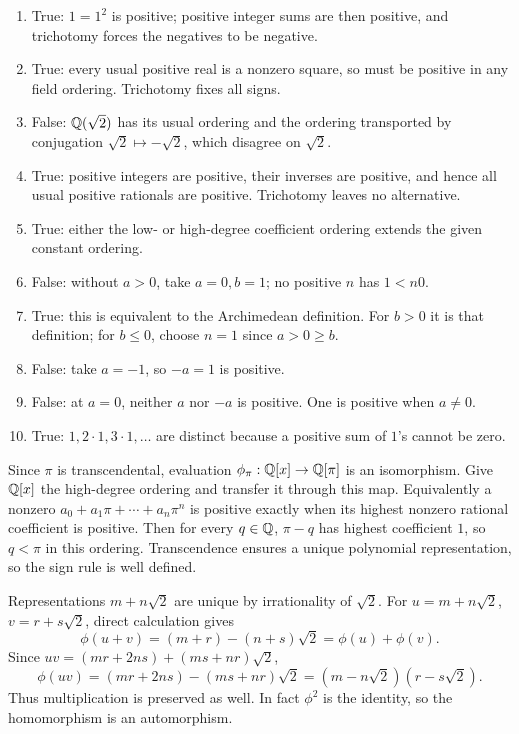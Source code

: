 \begin{enumerate}[label=(\alph*)]
\item True: $1=1^2$ is positive; positive integer sums are then positive, and trichotomy forces the negatives to be negative.
\item True: every usual positive real is a nonzero square, so must be positive in any field ordering. Trichotomy fixes all signs.
\item False: $\mathbb{Q}(\sqrt2)$ has its usual ordering and the ordering transported by conjugation $\sqrt2\mapsto-\sqrt2$, which disagree on $\sqrt2$.
\item True: positive integers are positive, their inverses are positive, and hence all usual positive rationals are positive. Trichotomy leaves no alternative.
\item True: either the low- or high-degree coefficient ordering extends the given constant ordering.
\item False: without $a>0$, take $a=0,b=1$; no positive $n$ has $1<n0$.
\item True: this is equivalent to the Archimedean definition. For $b>0$ it is that definition; for $b\le0$, choose $n=1$ since $a>0\ge b$.
\item False: take $a=-1$, so $-a=1$ is positive.
\item False: at $a=0$, neither $a$ nor $-a$ is positive. One is positive when $a\ne0$.
\item True: $1,2\cdot1,3\cdot1,\ldots$ are distinct because a positive sum of $1$'s cannot be zero.
\end{enumerate}

Since $\pi$ is transcendental, evaluation $\phi_\pi:\mathbb{Q}[x]\to\mathbb{Q}[\pi]$ is an isomorphism. Give $\mathbb{Q}[x]$ the high-degree ordering and transfer it through this map. Equivalently a nonzero $a_0+a_1\pi+\cdots+a_n\pi^n$ is positive exactly when its highest nonzero rational coefficient is positive. Then for every $q\in\mathbb{Q}$, $\pi-q$ has highest coefficient $1$, so $\boxed{q<\pi}$ in this ordering. Transcendence ensures a unique polynomial representation, so the sign rule is well defined.

Representations $m+n\sqrt2$ are unique by irrationality of $\sqrt2$. For $u=m+n\sqrt2$, $v=r+s\sqrt2$, direct calculation gives
\[\phi(u+v)=(m+r)-(n+s)\sqrt2=\phi(u)+\phi(v).
\]
Since $uv=(mr+2ns)+(ms+nr)\sqrt2$,
\[\phi(uv)=(mr+2ns)-(ms+nr)\sqrt2=(m-n\sqrt2)(r-s\sqrt2).
\]
Thus multiplication is preserved as well. In fact $\phi^2$ is the identity, so the homomorphism is an automorphism.

